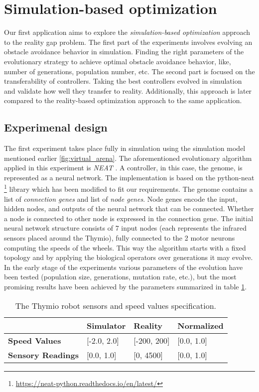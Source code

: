 \section{Simulation-based optimization}

Our first application aims to explore the \emph{simulation-based optimization} approach to the reality gap problem. The first part of the experiments involves evolving an obstacle avoidance behavior in simulation. Finding the right parameters of the evolutionary strategy to achieve optimal obstacle avoidance behavior, like, number of generations, population number, etc. The second part is focused on the transferability of controllers. Taking the best controllers evolved in simulation and validate how well they transfer to reality. Additionally, this approach is later compared to the reality-based optimization approach to the same application.

\subsection{Experimenal design}

The first experiment takes place fully in simulation using the simulation model mentioned earlier \ref{fig:virtual_arena}. The aforementioned evolutionary algorithm applied in this experiment is \emph{NEAT} \cite{stanley2002evolving}. A controller, in this case, the genome, is represented as a neural network. The implementation is based on the python-neat \footnote{\url{https://neat-python.readthedocs.io/en/latest/}} library which has been modified to fit our requirements. The genome contains a list of \emph{connection genes} and list of \emph{node genes}. Node genes encode the input, hidden nodes, and outputs of the neural network that can be connected. Whether a node is connected to other node is expressed in the connection gene. The initial neural network structure consists of 7 input nodes (each represents the infrared sensors placed around the Thymio), fully connected to the 2 motor neurons computing the speeds of the wheels. This way the algorithm starts with a fixed topology and by applying the biological operators over generations it may evolve. In the early stage of the experiments various parameters of the evolution have been tested (population size, generations, mutation rate, etc.), but the most promising results have been achieved by the parameters summarized in table \ref{neat_parameters}.

\begin{table}[H]
\begin{tabular}{llll}
\centering
\hline
\textbf{}                            & \textbf{Simulator}   & \textbf{Reality}  & \textbf{Normalized}  \\ \hline
\textbf{Speed Values}                & {[}-2.0, 2.0{]}       & {[}-200, 200{]}      & {[}0.0, 1.0{]} \\
\textbf{Sensory Readings}            & {[}0.0, 1.0{]}        & {[}0, 4500{]}        & {[}0.0, 1.0{]} \\
\end{tabular}
\caption{The Thymio robot sensors and speed values specification.}
\label{neat_parameters}
\end{table}

